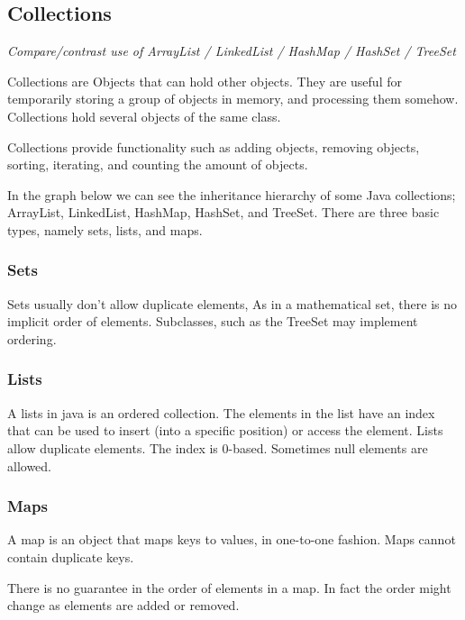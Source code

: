 \subsection{Collections}
\textit{Compare/contrast use of ArrayList / LinkedList / HashMap / HashSet / TreeSet}

Collections are Objects that can hold other objects. They are useful for temporarily storing a group of objects in memory, and processing them somehow. Collections hold several objects of the same class. 

Collections provide functionality such as adding objects, removing objects, sorting, iterating, and counting the amount of objects.

In the graph below we can see the inheritance hierarchy of some Java collections; ArrayList, LinkedList, HashMap, HashSet, and TreeSet. There are three basic types, namely sets, lists, and maps.

\subsubsection{Sets}
Sets usually don't allow duplicate elements, As in a mathematical set, there is no implicit order of elements. Subclasses, such as the TreeSet may implement ordering.\cite{set}

\subsubsection{Lists}
A lists in java is an ordered collection. The elements in the list have an index that can be used to insert (into a specific position) or access the element. Lists allow duplicate elements. The index is 0-based. Sometimes null elements are allowed.\cite{list}

\subsubsection{Maps}
A map is an object that maps keys to values, in one-to-one fashion. Maps cannot contain duplicate keys. \cite{map}

There is no guarantee in the order of elements in a map. In fact the order might change as elements are added or removed.  \cite{map}

